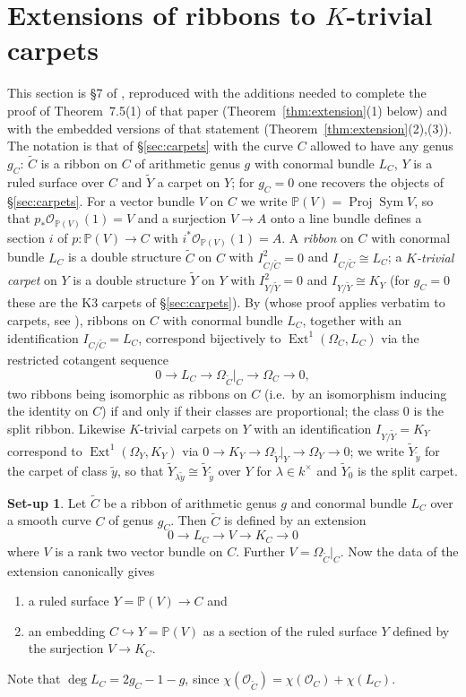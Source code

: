 \documentclass[11pt,reqno]{amsart}
\theoremstyle{plain}
\theoremstyle{definition}
\newtheorem{setup}[theorem]{Set-up}
\newcommand{\PP}{\mathbb{P}}
\newcommand{\OO}{\mathcal{O}}
\newcommand{\Ext}{\operatorname{Ext}}
\newcommand{\Yt}{\widetilde{Y}}
\newcommand{\Ct}{\widetilde{C}}
\newcommand{\yt}{\tilde{y}}
\begin{document}
\section{Extensions of ribbons to \texorpdfstring{$K$}{K}-trivial carpets}\label{sec:extensions}

This section is \S7 of \cite{DM25}, reproduced with the additions needed to complete the proof of Theorem~7.5(1) of that paper (Theorem~\ref{thm:extension}(1) below) and with the embedded versions of that statement (Theorem~\ref{thm:extension}(2),(3)). The notation is that of \S\ref{sec:carpets} with the curve $C$ allowed to have any genus $g_C$: $\Ct$ is a ribbon on $C$ of arithmetic genus $g$ with conormal bundle $L_C$, $Y$ is a ruled surface over $C$ and $\Yt$ a carpet on $Y$; for $g_C=0$ one recovers the objects of \S\ref{sec:carpets}. For a vector bundle $V$ on $C$ we write $\PP(V)=\operatorname{Proj}\operatorname{Sym}V$, so that $p_*\OO_{\PP(V)}(1)=V$ and a surjection $V\to A$ onto a line bundle defines a section $i$ of $p\colon\PP(V)\to C$ with $i^*\OO_{\PP(V)}(1)=A$. A \emph{ribbon} on $C$ with conormal bundle $L_C$ is a double structure $\Ct$ on $C$ with $I_{C/\Ct}^2=0$ and $I_{C/\Ct}\cong L_C$; a \emph{$K$-trivial carpet} on $Y$ is a double structure $\Yt$ on $Y$ with $I_{Y/\Yt}^2=0$ and $I_{Y/\Yt}\cong K_Y$ (for $g_C=0$ these are the K3 carpets of \S\ref{sec:carpets}). By \cite[Theorem~1.2]{BE95} (whose proof applies verbatim to carpets, see \cite[Lemma~3.1]{DM25}), ribbons on $C$ with conormal bundle $L_C$, together with an identification $I_{C/\Ct}=L_C$, correspond bijectively to $\Ext^1(\Omega_C,L_C)$ via the restricted cotangent sequence
\[
0\to L_C\to\Omega_{\Ct}|_C\to\Omega_C\to0 ,
\]
two ribbons being isomorphic as ribbons on $C$ (i.e.\ by an isomorphism inducing the identity on $C$) if and only if their classes are proportional; the class $0$ is the split ribbon. Likewise $K$-trivial carpets on $Y$ with an identification $I_{Y/\Yt}=K_Y$ correspond to $\Ext^1(\Omega_Y,K_Y)$ via $0\to K_Y\to\Omega_{\Yt}|_Y\to\Omega_Y\to0$; we write $\Yt_{\yt}$ for the carpet of class $\yt$, so that $\Yt_{\lambda\yt}\cong\Yt_{\yt}$ over $Y$ for $\lambda\in k^{\times}$ and $\Yt_0$ is the split carpet.

\begin{setup}\label{setup:ribbon}
Let $\Ct$ be a ribbon of arithmetic genus $g$ and conormal bundle $L_C$ over a smooth curve $C$ of genus $g_C$. Then $\Ct$ is defined by an extension
\[
0\to L_C\to V\to K_C\to0
\]
where $V$ is a rank two vector bundle on $C$. Further $V=\Omega_{\Ct}|_C$. Now the data of the extension canonically gives
\begin{enumerate}
\item a ruled surface $Y=\PP(V)\to C$ and
\item an embedding $C\hookrightarrow Y=\PP(V)$ as a section of the ruled surface $Y$ defined by the surjection $V\to K_C$.
\end{enumerate}
Note that $\deg L_C=2g_C-1-g$, since $\chi(\OO_{\Ct})=\chi(\OO_C)+\chi(L_C)$.
\end{setup}
\end{document}
